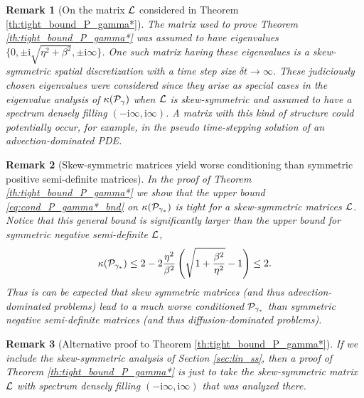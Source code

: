 \documentclass[a4paper,10pt]{article}
\newtheorem{remark}{Remark}
\begin{document}
\begin{remark}[On the matrix ${\cal L}$ considered in Theorem \ref{th:tight_bound_P_gamma*}]
The matrix used to prove Theorem \ref{th:tight_bound_P_gamma*} was assumed to have eigenvalues $\{0, \pm \mathrm{i} \sqrt{\eta^2 + \beta^2}, \pm \mathrm{i} \infty\}$. One such matrix having these eigenvalues is a skew-symmetric spatial discretization with a time step size $\delta t \to \infty$. These judiciously chosen eigenvalues were considered since they arise as special cases in the eigenvalue analysis of $\kappa({\cal P}_{\gamma})$ when ${\cal L}$ is skew-symmetric and assumed to have a spectrum densely filling $(-\mathrm{i} \infty,\mathrm{i} \infty)$.
%
A matrix with this kind of structure could potentially occur, for example, in the pseudo time-stepping solution of an advection-dominated PDE. 
\end{remark}

\begin{remark}[Skew-symmetric matrices yield worse conditioning than symmetric positive semi-definite matrices]
In the proof of Theorem \ref{th:tight_bound_P_gamma*} we show that the upper bound \eqref{eq:cond_P_gamma*_bnd} on $\kappa({\cal P}_{\gamma_*})$ is tight for a skew-symmetric matrices ${\cal L}$. Notice that this general bound is significantly larger than the upper bound for symmetric negative semi-definite ${\cal L}$,
\begin{align*}
\kappa({\cal P}_{\gamma_*}) \leq 2 - 2 \frac{\eta^2}{\beta^2} \left(\sqrt{1 + \frac{\beta^2}{\eta^2}} - 1 \right) \leq 2.
\end{align*}
Thus is can be expected that skew symmetric matrices (and thus advection-dominated problems) lead to a much worse conditioned ${\cal P}_{\gamma_*}$ than symmetric negative semi-definite matrices (and thus diffusion-dominated problems).
\end{remark}

\begin{remark}[Alternative proof to Theorem \ref{th:tight_bound_P_gamma*}]
If we include the skew-symmetric analysis of Section \ref{sec:lin_ss}, then a proof of Theorem \ref{th:tight_bound_P_gamma*} is just to take the skew-symmetric matrix ${\cal L}$ with spectrum densely filling $(-\mathrm{i} \infty,\mathrm{i} \infty)$ that was analyzed there.
\end{remark}

\end{document}
